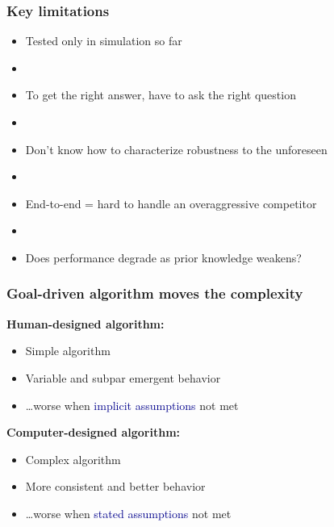 \documentclass[svgnames]{beamer}
\begin{document}
\begin{frame}
\frametitle{Key limitations}

\begin{itemize}
\item Tested only in simulation so far

\item[]

\item To get the right answer, have to ask the right question

\item[]

\item Don't know how to characterize robustness to the unforeseen

\item[]

\item End-to-end = hard to handle an overaggressive competitor

\item[]

\item Does performance degrade as prior knowledge weakens?

\end{itemize}

\end{frame}

\begin{frame}
\frametitle{Goal-driven algorithm \textbf{moves} the complexity}

\textbf{Human-designed algorithm:}

\begin{itemize}
\item Simple algorithm
\item Variable and subpar emergent behavior
\item[] \ldots worse when \textcolor{DarkBlue}{implicit assumptions} not met
\end{itemize}

\textbf{Computer-designed algorithm:}

\begin{itemize}
\item Complex algorithm
\item More consistent and better behavior
\item[] \ldots worse when \textcolor{DarkBlue}{stated assumptions} not met
\end{itemize}

\end{frame}
\end{document}
